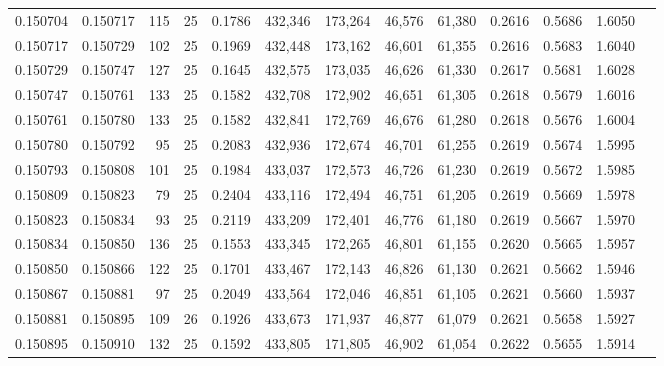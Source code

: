 \begin{tabular}{rrrrrrrrrrrrr}
0.150704 & 0.150717 &   115 &  25 &                                     0.1786 & 432,346 & 173,264 &  46,576 &  61,380 & 0.2616 & 0.5686 & 1.6050 \\
0.150717 & 0.150729 &   102 &  25 &                                     0.1969 & 432,448 & 173,162 &  46,601 &  61,355 & 0.2616 & 0.5683 & 1.6040 \\
0.150729 & 0.150747 &   127 &  25 &                                     0.1645 & 432,575 & 173,035 &  46,626 &  61,330 & 0.2617 & 0.5681 & 1.6028 \\
0.150747 & 0.150761 &   133 &  25 &                                     0.1582 & 432,708 & 172,902 &  46,651 &  61,305 & 0.2618 & 0.5679 & 1.6016 \\
0.150761 & 0.150780 &   133 &  25 &                                     0.1582 & 432,841 & 172,769 &  46,676 &  61,280 & 0.2618 & 0.5676 & 1.6004 \\
0.150780 & 0.150792 &    95 &  25 &                                     0.2083 & 432,936 & 172,674 &  46,701 &  61,255 & 0.2619 & 0.5674 & 1.5995 \\
0.150793 & 0.150808 &   101 &  25 &                                     0.1984 & 433,037 & 172,573 &  46,726 &  61,230 & 0.2619 & 0.5672 & 1.5985 \\
0.150809 & 0.150823 &    79 &  25 &                                     0.2404 & 433,116 & 172,494 &  46,751 &  61,205 & 0.2619 & 0.5669 & 1.5978 \\
0.150823 & 0.150834 &    93 &  25 &                                     0.2119 & 433,209 & 172,401 &  46,776 &  61,180 & 0.2619 & 0.5667 & 1.5970 \\
0.150834 & 0.150850 &   136 &  25 &                                     0.1553 & 433,345 & 172,265 &  46,801 &  61,155 & 0.2620 & 0.5665 & 1.5957 \\
0.150850 & 0.150866 &   122 &  25 &                                     0.1701 & 433,467 & 172,143 &  46,826 &  61,130 & 0.2621 & 0.5662 & 1.5946 \\
0.150867 & 0.150881 &    97 &  25 &                                     0.2049 & 433,564 & 172,046 &  46,851 &  61,105 & 0.2621 & 0.5660 & 1.5937 \\
0.150881 & 0.150895 &   109 &  26 &                                     0.1926 & 433,673 & 171,937 &  46,877 &  61,079 & 0.2621 & 0.5658 & 1.5927 \\
0.150895 & 0.150910 &   132 &  25 &                                     0.1592 & 433,805 & 171,805 &  46,902 &  61,054 & 0.2622 & 0.5655 & 1.5914 \\

\end{tabular}

